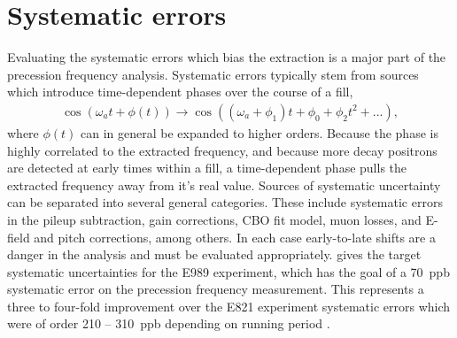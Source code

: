 
\thispagestyle{myheadings}

\graphicspath{{Body/Figures/Wa/Datasets/Endgame/LostMuonFiles/MainCuts/}{Body/Figures/Wa/Datasets/ComparisonPlots/LostMuons/}{Body/Figures/Wa/Datasets/9d/SingleIteration/LostMuonFits/}{Body/Figures/Wa/Datasets/9d/PileupJobs/PileupGapTime/}{Body/Figures/Wa/Datasets/9d/PileupJobs/PileupDeadTime/auto-scaling/}{Body/Figures/Wa/Datasets/9d/PileupJobs/PileupDeadTime/fixed-scaling/}{Body/Figures/Wa/Datasets/9d/PileupJobs/PileupEnergyScale/}{Body/Figures/Wa/Datasets/9d/PileupJobs/PileupTimeShift/}{Body/Figures/Wa/Datasets/9d/SingleIteration/PileupMultiplierScan/}{Body/Figures/Wa/Datasets/60h/RatioConstruction/Ta/}{Body/Figures/Wa/Datasets/60h/RatioConstruction/TauMu/}{Body/Figures/Wa/Datasets/9d/Binning/BinEdge/}{Body/Figures/Wa/Datasets/9d/Binning/BinWidth/}{Body/Figures/Wa/Datasets/60h/Gain/0p25-steps/}{Body/Figures/Wa/Datasets/60h/Gain/Lifetime/}}




\section{Systematic errors}
\label{sec:SystematicErrors}


Evaluating the systematic errors which bias the \wa extraction is a major part of the precession frequency analysis. Systematic errors typically stem from sources which introduce time-dependent phases over the course of a fill,
    \begin{align} \label{eq:timeDependentPhase}
        \cos{(\omega_{a}t + \phi(t))} \rightarrow \cos{((\omega_{a}+\phi_{1})t + \phi_{0} + \phi_{2}t^{2} + ...)},
    \end{align}
where $\phi(t)$ can in general be expanded to higher orders. Because the phase is highly correlated to the extracted frequency, and because more decay positrons are detected at early times within a fill, a time-dependent phase pulls the extracted frequency away from it's real value. Sources of systematic uncertainty can be separated into several general categories. These include systematic errors in the pileup subtraction,  gain corrections, CBO fit model, muon losses, and E-field and pitch corrections, among others. In each case early-to-late shifts are a danger in the analysis and must be evaluated appropriately.  gives the target systematic uncertainties for the E989 experiment, which has the goal of a \SI{70}{ppb} systematic error on the precession frequency measurement. This represents a three to four-fold improvement over the E821 experiment systematic errors which were of order \SI{210}{} -- \SI{310}{ppb} depending on running period \cite{E821FinalReport}.

